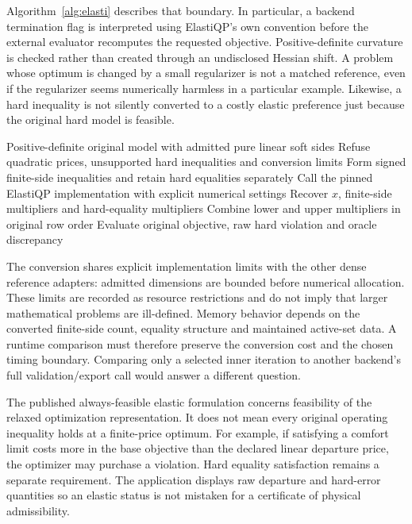 Algorithm~\ref{alg:elasti} describes that boundary. In particular, a backend
termination flag is interpreted using ElastiQP's own convention before the
external evaluator recomputes the requested objective. Positive-definite
curvature is checked rather than created through an undisclosed Hessian shift.
A problem whose optimum is changed by a small regularizer is not a matched
reference, even if the regularizer seems numerically harmless in a particular
example. Likewise, a hard inequality is not silently converted to a costly
elastic preference just because the original hard model is feasible.

\begin{algorithm}[htbp]
\caption{Preserve admitted pure linear interval prices and hard equalities in ElastiQP, then recover original row multipliers and independently evaluate the scientific objective.}\label{alg:elasti}
\begin{algorithmic}[1]
\Require Positive-definite original model with admitted pure linear soft sides
\State Refuse quadratic prices, unsupported hard inequalities and conversion limits
\State Form signed finite-side inequalities and retain hard equalities separately
\State Call the pinned ElastiQP implementation with explicit numerical settings
\State Recover $x$, finite-side multipliers and hard-equality multipliers
\State Combine lower and upper multipliers in original row order
\State Evaluate original objective, raw hard violation and oracle discrepancy
\end{algorithmic}
\end{algorithm}

The conversion shares explicit implementation limits with the other dense
reference adapters: admitted dimensions are bounded before numerical allocation.
These limits are recorded as resource restrictions and do not imply that larger
mathematical problems are ill-defined. Memory behavior depends on the converted
finite-side count, equality structure and maintained active-set data. A runtime
comparison must therefore preserve the conversion cost and the chosen timing
boundary. Comparing only a selected inner iteration to another backend's full
validation/export call would answer a different question.

The published always-feasible elastic formulation concerns feasibility of the
relaxed optimization representation. It does not mean every original operating
inequality holds at a finite-price optimum. For example, if satisfying a comfort
limit costs more in the base objective than the declared linear departure price,
the optimizer may purchase a violation. Hard equality satisfaction remains a
separate requirement. The application displays raw departure and hard-error
quantities so an elastic status is not mistaken for a certificate of physical
admissibility.

